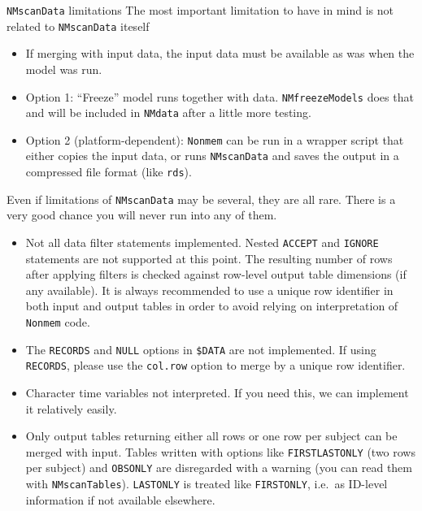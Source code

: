 \documentclass[
  8pt,
  ignorenonframetext,
  aspectratio=169]{beamer}
\providecommand{\tightlist}{%
  \setlength{\itemsep}{0pt}\setlength{\parskip}{0pt}}
\begin{document}
\begin{frame}[fragile]{\texttt{NMscanData} limitations}
\protect\hypertarget{nmscandata-limitations}{}
The most important limitation to have in mind is not related to
\texttt{NMscanData} iteself

\begin{itemize}
\tightlist
\item
  If merging with input data, the input data must be available as was
  when the model was run.
\item
  Option 1: ``Freeze'' model runs together with data.
  \texttt{NMfreezeModels} does that and will be included in
  \texttt{NMdata} after a little more testing.
\item
  Option 2 (platform-dependent): \texttt{Nonmem} can be run in a wrapper
  script that either copies the input data, or runs \texttt{NMscanData}
  and saves the output in a compressed file format (like \texttt{rds}).
\end{itemize}

Even if limitations of \texttt{NMscanData} may be several, they are all
rare. There is a very good chance you will never run into any of them.

\begin{itemize}
\item
  Not all data filter statements implemented. Nested \texttt{ACCEPT} and
  \texttt{IGNORE} statements are not supported at this point. The
  resulting number of rows after applying filters is checked against
  row-level output table dimensions (if any available). It is always
  recommended to use a unique row identifier in both input and output
  tables in order to avoid relying on interpretation of \texttt{Nonmem}
  code.
\item
  The \texttt{RECORDS} and \texttt{NULL} options in \texttt{\$DATA} are
  not implemented. If using \texttt{RECORDS}, please use the
  \texttt{col.row} option to merge by a unique row identifier.
\item
  Character time variables not interpreted. If you need this, we can
  implement it relatively easily.
\item
  Only output tables returning either all rows or one row per subject
  can be merged with input. Tables written with options like
  \texttt{FIRSTLASTONLY} (two rows per subject) and \texttt{OBSONLY} are
  disregarded with a warning (you can read them with
  \texttt{NMscanTables}). \texttt{LASTONLY} is treated like
  \texttt{FIRSTONLY}, i.e.~as ID-level information if not available
  elsewhere.
\end{itemize}
\end{frame}
\end{document}
